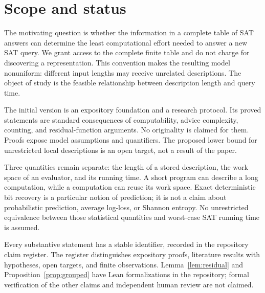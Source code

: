 \section{Scope and status}
The motivating question is whether the information in a complete table of SAT
answers can determine the least computational effort needed to answer a new
SAT query. We grant access to the complete finite table and do not charge for
discovering a representation. This convention makes the resulting model
nonuniform: different input lengths may receive unrelated descriptions.
The object of study is the feasible relationship between description
length and query time.

The initial version is an expository foundation and a research protocol.
Its proved statements are standard consequences of computability, advice
complexity, counting, and residual-function arguments. No originality is
claimed for them. Proofs expose model assumptions and quantifiers.
The proposed lower bound for unrestricted local descriptions is an open
target, not a result of the paper.

Three quantities remain separate: the length of a stored description,
the work space of an evaluator, and its running time. A short program can
describe a long computation, while a computation can reuse its work space.
Exact deterministic bit recovery is a particular notion of prediction;
it is not a claim about probabilistic prediction, average log-loss, or
Shannon entropy. No unrestricted equivalence between those statistical
quantities and worst-case SAT running time is assumed.

Every substantive statement has a stable identifier, recorded in the
repository claim register. The register distinguishes expository proofs,
literature results with hypotheses, open targets, and finite observations.
Lemma~\ref{lem:residual} and Proposition~\ref{prop:grouped} have Lean
formalizations in the repository; formal verification of the other claims
and independent human review are not claimed.
